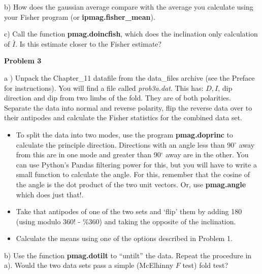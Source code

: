 {b) How does the gaussian average compare with the average you calculate using your Fisher program (or  {\bf ipmag.fisher\_mean}).

c) Call  the function  {\bf pmag.doincfish}, which does the inclination only calculation of $\bar I$.  Is this estimate closer to the Fisher estimate?   

{\bf Problem 3}

a ) Unpack the Chapter\_11 datafile from the data\_files archive (see the Preface for instructions).   You will find a file called {\it prob3a.dat}.   This has:   $D, I$, dip direction and dip from two limbs of the fold.    They are of both polarities.   Separate the data into normal and reverse polarity,  flip the reverse data over to their antipodes and calculate the Fisher statistics for the combined data set.

\begin{itemize}
\item    To split the data into two modes, use the program {\bf pmag.doprinc} to calculate the principle direction.  Directions with an angle less than 90$^{\circ}$ away from this are in one mode and greater than 90$^{\circ}$ away are in the other.  You can use Python's Pandas filtering power for this, but you will have to write a small function to calculate the angle.  For this, remember that the cosine of the angle is the dot product of the two unit vectors.  Or, use {\bf pmag.angle} which does just that!. 
\item  Take that antipodes of one of the two sets and `flip' them by adding 180 (using modulo 360! - \%360) and taking the opposite of the inclination.   
\item Calculate the means using one of the options described in Problem 1. 
\end{itemize}


b)     Use the function {\bf pmag.dotilt}  to ``untilt'' the data.   Repeat the procedure in a).     Would the two data sets pass a simple (McElhinny $F$ test) fold test?  


}



